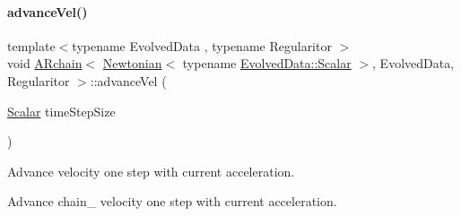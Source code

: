 \paragraph{\texorpdfstring{advance\+Vel()}{advanceVel()}}
{\footnotesize\ttfamily template$<$typename Evolved\+Data , typename Regularitor $>$ \\
void \mbox{\hyperlink{class_a_rchain}{A\+Rchain}}$<$ \mbox{\hyperlink{class_newtonian}{Newtonian}}$<$ typename \mbox{\hyperlink{class_a_rchain_a707e42a79e4744424a34c9007e84ee07}{Evolved\+Data\+::\+Scalar}} $>$, Evolved\+Data, Regularitor $>$\+::advance\+Vel (\begin{DoxyParamCaption}\item[{\mbox{\hyperlink{class_a_rchain_3_01_newtonian_3_01typename_01_evolved_data_1_1_scalar_01_4_00_01_evolved_data_00_01_regularitor_01_4_a2c77dc1b58a25ac5c6ee95dd7809f693}{Scalar}}}]{time\+Step\+Size }\end{DoxyParamCaption})}



Advance velocity one step with current acceleration. 

Advance chain_ velocity one step with current acceleration.

